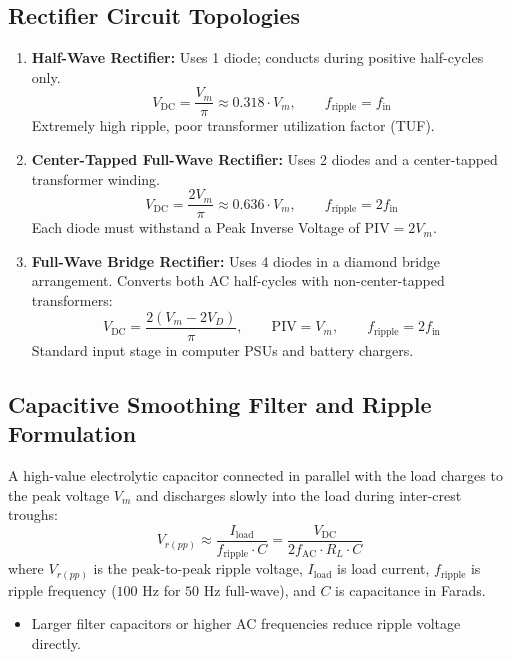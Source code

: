 \subsection{Rectifier Circuit Topologies}
\begin{enumerate}[label=\bfseries\arabic*.]
    \item \textbf{Half-Wave Rectifier:} Uses 1 diode; conducts during positive half-cycles only.
    \begin{equation}
    \label{eq:hwr_vdc}
    V_{\text{DC}} = \frac{V_m}{\pi} \approx 0.318 \cdot V_m, \qquad f_{\text{ripple}} = f_{\text{in}}
    \end{equation}
    Extremely high ripple, poor transformer utilization factor (TUF).
    \item \textbf{Center-Tapped Full-Wave Rectifier:} Uses 2 diodes and a center-tapped transformer winding.
    \begin{equation}
    \label{eq:fwr_vdc}
    V_{\text{DC}} = \frac{2 V_m}{\pi} \approx 0.636 \cdot V_m, \qquad f_{\text{ripple}} = 2 f_{\text{in}}
    \end{equation}
    Each diode must withstand a Peak Inverse Voltage of $\text{PIV} = 2 V_m$.
    \item \textbf{Full-Wave Bridge Rectifier:} Uses 4 diodes in a diamond bridge arrangement. Converts both AC half-cycles with non-center-tapped transformers:
    \begin{equation}
    \label{eq:bridge_vdc}
    V_{\text{DC}} = \frac{2 (V_m - 2 V_D)}{\pi}, \qquad \text{PIV} = V_m, \qquad f_{\text{ripple}} = 2 f_{\text{in}}
    \end{equation}
    Standard input stage in computer PSUs and battery chargers.
\end{enumerate}

\subsection{Capacitive Smoothing Filter and Ripple Formulation}
A high-value electrolytic capacitor connected in parallel with the load charges to the peak voltage $V_m$ and discharges slowly into the load during inter-crest troughs:
\begin{equation}
\label{eq:ripple_voltage}
\boxed{V_{r(pp)} \approx \frac{I_{\text{load}}}{f_{\text{ripple}} \cdot C} = \frac{V_{\text{DC}}}{2 f_{\text{AC}} \cdot R_L \cdot C}}
\end{equation}
where $V_{r(pp)}$ is the peak-to-peak ripple voltage, $I_{\text{load}}$ is load current, $f_{\text{ripple}}$ is ripple frequency ($100\text{ Hz}$ for $50\text{ Hz}$ full-wave), and $C$ is capacitance in Farads.
\begin{itemize}
    \item Larger filter capacitors or higher AC frequencies reduce ripple voltage directly.
\end{itemize}

